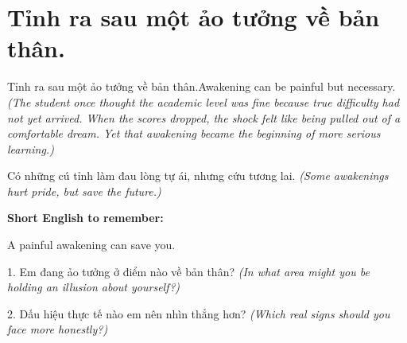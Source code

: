\section{Tỉnh ra sau một ảo tưởng về bản thân.}
\begin{truyen}{Tỉnh ra sau một ảo tưởng về bản thân.}{Awakening can be painful but necessary.}
\textit{(The student once thought the academic level was fine because true difficulty had not yet arrived. When the scores dropped, the shock felt like being pulled out of a comfortable dream. Yet that awakening became the beginning of more serious learning.)}
\end{truyen}
\begin{baihoc}
Có những cú tỉnh làm đau lòng tự ái, nhưng cứu tương lai.
\textit{(Some awakenings hurt pride, but save the future.)}
\end{baihoc}
\begin{ghinhoanh}
\textbf{Short English to remember:}

A painful awakening can save you.
\end{ghinhoanh}
\begin{tuhocnhanh}
1. Em đang ảo tưởng ở điểm nào về bản thân? \textit{(In what area might you be holding an illusion about yourself?)}

2. Dấu hiệu thực tế nào em nên nhìn thẳng hơn? \textit{(Which real signs should you face more honestly?)}
\end{tuhocnhanh}
\ngancach

